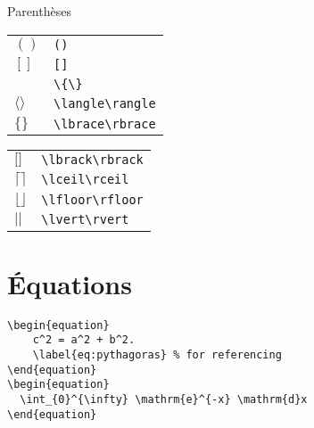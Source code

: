 \documentclass{article}
\begin{document}
\begin{multicols*}{3}
Parenthèses
\begin{multicols*}{2}
\begin{tabularx}{\columnwidth}{lX}
  $()$ & \verb+()+ \\
  $[]$ & \verb+[]+ \\
  ${}$ & \verb+\{\}+ \\
  $\langle\rangle$ & \verb+\langle\rangle+ \\
  $\lbrace\rbrace$ & \verb+\lbrace\rbrace+ \\
\end{tabularx}
\columnbreak
\begin{tabularx}{\columnwidth}{lX}
  $\lbrack\rbrack$ & \verb+\lbrack\rbrack+ \\
  $\lceil\rceil$ & \verb+\lceil\rceil+ \\
  $\lfloor\rfloor$ & \verb+\lfloor\rfloor+ \\
  $\lvert\rvert$ & \verb+\lvert\rvert+ \\
\end{tabularx}
\end{multicols*}
\section*{Équations}

\begin{lstlisting}
\begin{equation}
    c^2 = a^2 + b^2.
    \label{eq:pythagoras} % for referencing
\end{equation}
\begin{equation}
  \int_{0}^{\infty} \mathrm{e}^{-x} \mathrm{d}x
\end{equation}


\end{lstlisting}
\end{multicols*}
\end{document}
